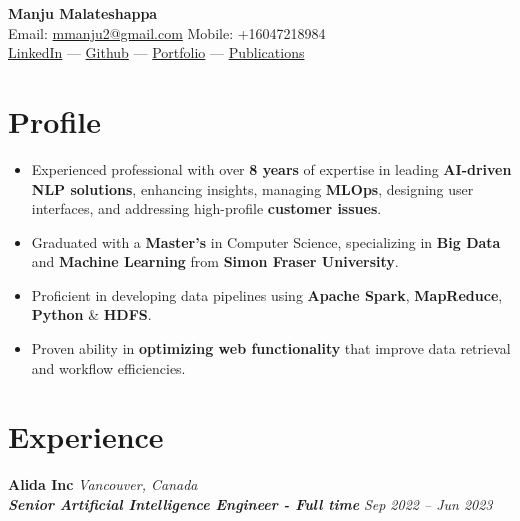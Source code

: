 \documentclass[11pt,a4paper]{article}
\newcommand{\resumeItem}[1]{\item #1}
\newcommand{\jobheading}[4]{%
  \noindent\textbf{#1} \hfill \textit{#2} \\
  \textit{\textbf{#3}} \hfill \textit{#4}
}
\begin{document}
\begin{center}
  {\LARGE \textbf{Manju Malateshappa}} \\[4pt]
  Email: \href{mailto:mmanju2@gmail.com}{mmanju2@gmail.com} \hfill Mobile: +16047218984 \\
  \href{https://www.linkedin.com/}{LinkedIn} ---
  \href{https://github.com/}{Github} ---
  \href{https://portfolio.com/}{Portfolio} ---
  \href{https://publications.com/}{Publications}
\end{center}

\section{Profile}

\begin{itemize}[leftmargin=*, itemsep=2pt, topsep=2pt]
  \resumeItem{Experienced professional with over \textbf{8 years} of expertise in leading \textbf{AI-driven NLP solutions}, enhancing insights, managing \textbf{MLOps}, designing user interfaces, and addressing high-profile \textbf{customer issues}.}
  \resumeItem{Graduated with a \textbf{Master's} in Computer Science, specializing in \textbf{Big Data} and \textbf{Machine Learning} from \textbf{Simon Fraser University}.}
  \resumeItem{Proficient in developing data pipelines using \textbf{Apache Spark}, \textbf{MapReduce}, \textbf{Python} \& \textbf{HDFS}.}
  \resumeItem{Proven ability in \textbf{optimizing web functionality} that improve data retrieval and workflow efficiencies.}
\end{itemize}

\section{Experience}

\jobheading{Alida Inc}{Vancouver, Canada}{Senior Artificial Intelligence Engineer - Full time}{Sep 2022 -- Jun 2023}
\end{document}
